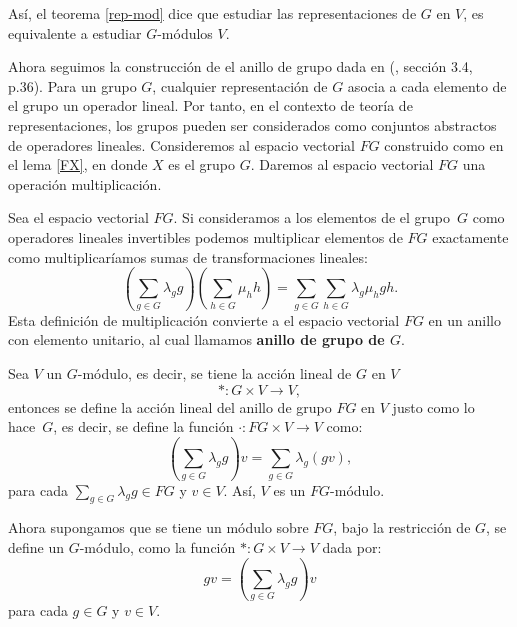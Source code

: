 \documentclass[12pt]{book}
\theoremstyle{definition}
\newtheorem{definition}[theorem]{Definición}
\newcounter{in}
\newcounter{ini}
\begin{document}

Así, el teorema \ref{rep-mod} dice que estudiar las representaciones de $G$
en $V$, es equivalente a estudiar $G$-módulos $V$. 

Ahora seguimos la construcción de el anillo de grupo dada en
(\cite{fulton1991representation}, sección 3.4, p.36). Para un grupo $G$, cualquier representación de $G$ asocia a cada
elemento de el grupo un operador lineal. Por tanto, en el contexto de
teoría de representaciones, los grupos pueden ser considerados como
conjuntos abstractos de operadores lineales. Consideremos al espacio
vectorial $FG$ construido como en el lema \ref{FX}, en donde $X$ es el grupo
$G$. Daremos al espacio vectorial $FG$ una operación multiplicación.

Sea el espacio vectorial $FG$. Si consideramos a los elementos de el
grupo~$G$ como operadores lineales invertibles podemos multiplicar
elementos de $FG$ exactamente como multiplicaríamos sumas de
transformaciones lineales:
\begin{equation*}
\label{mult-alg-grupo}
  (\sum_{g\in G}\lambda_{g}g)(\sum_{h\in G}\mu_{h}h)=\sum_{g\in
    G}\sum_{h \in G}\lambda_{g}\mu_{h}gh.
\end{equation*}
Esta definición de multiplicación convierte a el espacio vectorial
$FG$ en un anillo con elemento unitario, al cual llamamos
\textbf{anillo de grupo de $G$}.

Sea $V$ un $G$-módulo, es decir, se tiene la acción lineal de $G$ en $V$ 
$$*:G\times V\rightarrow V,$$ 
entonces se define la acción lineal del anillo de grupo $FG$ en $V$ justo
como lo hace~$G$, es decir, se define la función $\cdot:FG\times
V\rightarrow V$ como: 
\begin{equation*}
  (\sum_{g\in G}\lambda_{g}g)v=\sum_{g\in G}\lambda_{g}(gv),
\end{equation*}
para cada $\sum_{g\in G}\lambda_{g}g\in FG$ y $v\in V$. Así, $V$ es un
$FG$-módulo.

Ahora supongamos que se tiene un módulo sobre $FG$, bajo la
restricción de $G$, se define un $G$-módulo, como la función
$*:G\times V\rightarrow V$ dada por:
\begin{equation*}
  gv=(\sum_{g\in G}\lambda_{g}g)v
\end{equation*}
para cada $g\in G$ y $v\in V$. %
\end{document}
